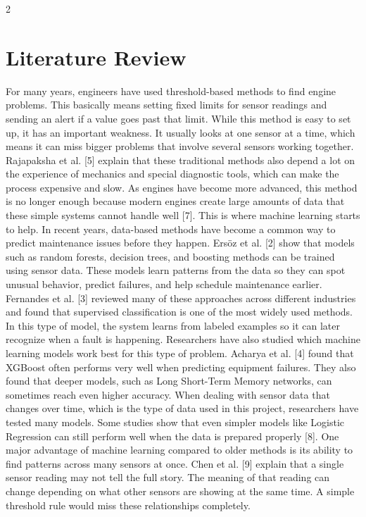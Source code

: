 \documentclass[10pt, letterpaper]{article}
\begin{document}
\begin{multicols}{2}
\section{Literature Review}
For many years, engineers have used threshold-based methods to find engine problems.
This basically means setting fixed limits for sensor readings and sending an alert if a value goes
past that limit. While this method is easy to set up, it has an important weakness. It usually looks
at one sensor at a time, which means it can miss bigger problems that involve several sensors
working together. Rajapaksha et al. [5] explain that these traditional methods also depend a lot
on the experience of mechanics and special diagnostic tools, which can make the process
expensive and slow. As engines have become more advanced, this method is no longer enough
because modern engines create large amounts of data that these simple systems cannot handle
well [7].
This is where machine learning starts to help. In recent years, data-based methods have
become a common way to predict maintenance issues before they happen. Ersöz et al. [2] show
that models such as random forests, decision trees, and boosting methods can be trained using
sensor data. These models learn patterns from the data so they can spot unusual behavior, predict
failures, and help schedule maintenance earlier. Fernandes et al. [3] reviewed many of these
approaches across different industries and found that supervised classification is one of the most
widely used methods. In this type of model, the system learns from labeled examples so it can
later recognize when a fault is happening.
Researchers have also studied which machine learning models work best for this type of
problem. Acharya et al. [4] found that XGBoost often performs very well when predicting
equipment failures. They also found that deeper models, such as Long Short-Term Memory
networks, can sometimes reach even higher accuracy. When dealing with sensor data that
changes over time, which is the type of data used in this project, researchers have tested many
models. Some studies show that even simpler models like Logistic Regression can still perform
well when the data is prepared properly [8].
One major advantage of machine learning compared to older methods is its ability to find
patterns across many sensors at once. Chen et al. [9] explain that a single sensor reading may not
tell the full story. The meaning of that reading can change depending on what other sensors are
showing at the same time. A simple threshold rule would miss these relationships completely.

\end{multicols}
\end{document}

